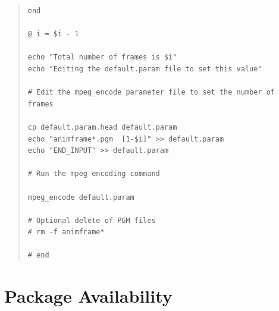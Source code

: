 \documentclass[twoside,11pt]{article}
\newcommand{\xlabel}[1]{}
\begin{document}
\begin{quote}
\begin{verbatim}
end

@ i = $i - 1
    
echo "Total number of frames is $i"
echo "Editing the default.param file to set this value"

# Edit the mpeg_encode parameter file to set the number of frames

cp default.param.head default.param
echo "animframe*.pgm  [1-$i]" >> default.param
echo "END_INPUT" >> default.param

# Run the mpeg encoding command

mpeg_encode default.param

# Optional delete of PGM files
# rm -f animframe*

# end
\end{verbatim}
\end{quote}
\normalsize

\section{\xlabel{sc15_available}Package Availability\label{sc15_available}}
\end{document}
